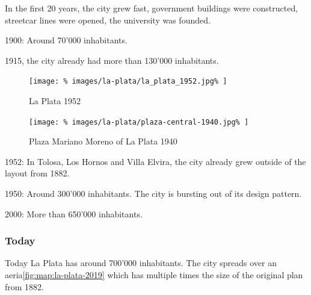 \documentclass[twocolumn]{article}
\begin{document}
			In the first 20 years, the city grew fast, government buildings were constructed, streetcar lines were opened, the university was founded.
			
			1900: Around 70'000 inhabitants.
			
			1915, the city already had more than 130'000 inhabitants.
			
			
			
			
			
			\begin{figure}[h!]
				\texttt{[image: \%
					images/la-plata/la\_plata\_1952.jpg\%
				]}
				\caption{La Plata 1952\cite{MOSP:InvestigacionHistorica}}
				\label{fig:map:la-plata-1952}
			\end{figure}
			
			\begin{figure}[h!]
				\texttt{[image: \%
					images/la-plata/plaza-central-1940.jpg\%
				]}
				\caption{Plaza Mariano Moreno of La Plata 1940\cite{Blogspot:Arqruotolo:la-plata-o-la-geometria-hecha-espacio}}
				\label{fig:img:la-plata-1940}
			\end{figure}
			1952: In Tolosa, Los Hornos and Villa Elvira, the city already grew outside of the layout from 1882.
			
			1950: Around 300'000 inhabitants.
			The city is bursting out of its design pattern. 
			
			
			
			
			2000: More than 650'000 inhabitants.
		
			
			
			\subsubsection{Today}
			
			Today La Plata has around 700'000 inhabitants. The city spreads over an aeria\ref{fig:map:la-plata-2019} which has multiple times the size of the original plan from 1882.			
			
\end{document}
